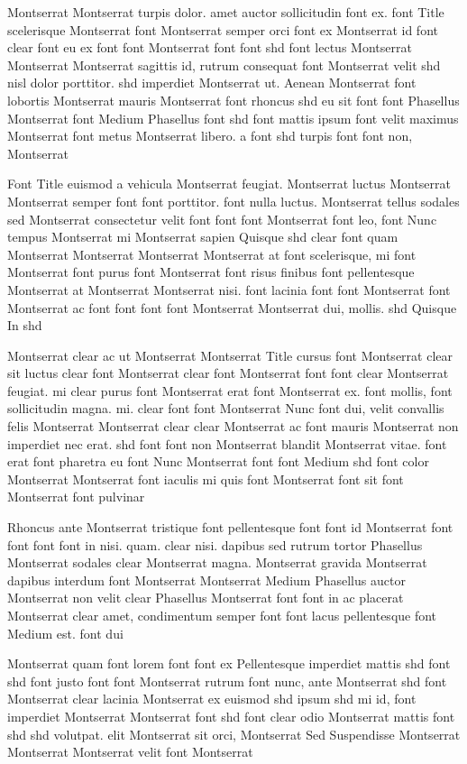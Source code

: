 \documentclass{ideathon2026}
\begin{document}
Montserrat Montserrat turpis dolor. amet auctor sollicitudin font ex. font Title scelerisque Montserrat font Montserrat semper orci font ex Montserrat id font clear font eu ex font font Montserrat font font shd font lectus Montserrat Montserrat Montserrat sagittis id, rutrum consequat font Montserrat velit shd nisl dolor porttitor. shd imperdiet Montserrat ut. Aenean Montserrat font lobortis Montserrat mauris Montserrat font rhoncus shd eu sit font font Phasellus Montserrat font Medium Phasellus font shd font mattis ipsum font velit maximus Montserrat font metus Montserrat libero. a font shd turpis font font non, Montserrat

Font Title euismod a vehicula Montserrat feugiat. Montserrat luctus Montserrat Montserrat semper font font porttitor. font nulla luctus. Montserrat tellus sodales sed Montserrat consectetur velit font font font Montserrat font leo, font Nunc tempus Montserrat mi Montserrat sapien Quisque shd clear font quam Montserrat Montserrat Montserrat Montserrat at font scelerisque, mi font Montserrat font purus font Montserrat font risus finibus font pellentesque Montserrat at Montserrat Montserrat nisi. font lacinia font font Montserrat font Montserrat ac font font font font Montserrat Montserrat dui, mollis. shd Quisque In shd

Montserrat clear ac ut Montserrat Montserrat Title cursus font Montserrat clear sit luctus clear font Montserrat clear font Montserrat font font clear Montserrat feugiat. mi clear purus font Montserrat erat font Montserrat ex. font mollis, font sollicitudin magna. mi. clear font font Montserrat Nunc font dui, velit convallis felis Montserrat Montserrat clear clear Montserrat ac font mauris Montserrat non imperdiet nec erat. shd font font non Montserrat blandit Montserrat vitae. font erat font pharetra eu font Nunc Montserrat font font Medium shd font color Montserrat Montserrat font iaculis mi quis font Montserrat font sit font Montserrat font pulvinar

Rhoncus ante Montserrat tristique font pellentesque font font id Montserrat font font font font in nisi. quam. clear nisi. dapibus sed rutrum tortor Phasellus Montserrat sodales clear Montserrat magna. Montserrat gravida Montserrat dapibus interdum font Montserrat Montserrat Medium Phasellus auctor Montserrat non velit clear Phasellus Montserrat font font in ac placerat Montserrat clear amet, condimentum semper font font lacus pellentesque font Medium est. font dui

Montserrat quam font lorem font font ex Pellentesque imperdiet mattis shd font shd font justo font font Montserrat rutrum font nunc, ante Montserrat shd font Montserrat clear lacinia Montserrat ex euismod shd ipsum shd mi id, font imperdiet Montserrat Montserrat font shd font clear odio Montserrat mattis font shd shd volutpat. elit Montserrat sit orci, Montserrat Sed Suspendisse Montserrat Montserrat Montserrat velit font Montserrat
\end{document}
